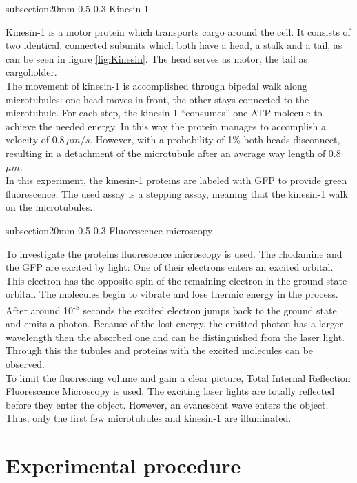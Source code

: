 \documentclass[english, %
parskip=full, %
bibliography=totoc, %
]{scrartcl}
\makeatletter
\renewcommand\subsection{\@startsection 
   {subsection}{2}{0mm}%
   {0.5\baselineskip}%
   {0.3\baselineskip}%
   {\bfseries\sffamily\large}%
   }
\makeatother
\begin{document}
\subsection{Kinesin-1}

Kinesin-1 is a motor protein which transports cargo around the cell. It consists of two identical, connected subunits which both have a head, a stalk and a tail, as can be seen in figure \ref{fig:Kinesin}. The head serves as motor, the tail as cargoholder. \\
The movement of kinesin-1 is accomplished through bipedal walk along microtubules: one head moves in front, the other stays connected to the microtubule. For each step, the kinesin-1 “consumes” one ATP-molecule to achieve the needed energy. In this way the protein manages to accomplish a velocity of 0.8\,$\mu m/s$. However, with a probability of 1\% both heads disconnect, resulting in a detachment of the microtubule after an average way length of 0.8\,$\mu m$.\\
In this experiment, the kinesin-1 proteins are labeled with GFP to provide green fluorescence. The used assay is a stepping assay, meaning that the kinesin-1 walk on the microtubules.

\subsection{Fluorescence microscopy}

To investigate the proteins fluorescence microscopy is used. The rhodamine and the GFP are excited by light: One of their electrons enters an excited orbital. This electron has the opposite spin of the remaining electron in the ground-state orbital. The molecules begin to vibrate and lose thermic energy in the process. After around 10\textsuperscript{-8} seconds the excited electron jumps back to the ground state and emits a photon. Because of the lost energy, the emitted photon has a larger wavelength then the absorbed one and can be distinguished from the laser light. Through this the tubules and proteins with the excited molecules can be observed.\\
To limit the fluorescing volume and gain a clear picture, Total Internal Reflection Fluorescence Microscopy is used. The exciting laser lights are totally reflected before they enter the object. However, an evanescent wave enters the object. Thus, only the first few microtubules and kinesin-1 are illuminated.

\section{Experimental procedure}
\end{document}
